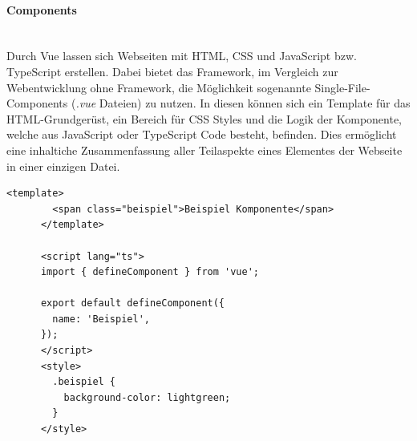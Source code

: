 \documentclass[10pt, a4paper]{article}
\begin{document}
\begin{onehalfspace}
  \paragraph*{Components} $~$ \\
  Durch Vue lassen sich Webseiten mit HTML, CSS und JavaScript bzw. TypeScript erstellen. Dabei bietet das Framework, im Vergleich zur Webentwicklung ohne Framework, die Möglichkeit sogenannte Single-File-Components (\textit{.vue} Dateien) zu nutzen. In diesen können sich ein Template für das HTML-Grundgerüst, ein Bereich für CSS Styles und die Logik der Komponente, welche aus JavaScript oder TypeScript Code besteht, befinden. Dies ermöglicht eine inhaltiche Zusammenfassung aller Teilaspekte eines Elementes der Webseite in einer einzigen Datei.
  \begin{minipage}{\textwidth}
    \begin{lstlisting}[caption={Beispiel einer simplen \textit{vue component}-Datei}, captionpos=b, label=lst:EinfacheComponent]
      <template>
        <span class="beispiel">Beispiel Komponente</span>
      </template>

      <script lang="ts">
      import { defineComponent } from 'vue';

      export default defineComponent({
        name: 'Beispiel',
      });
      </script>
      <style>
        .beispiel {
          background-color: lightgreen;
        }
      </style>
    \end{lstlisting}
  \end{minipage}


\end{onehalfspace}
\end{document}
